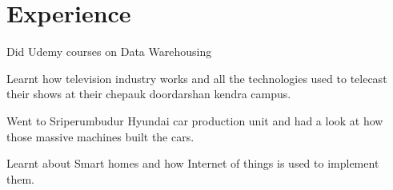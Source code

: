 \documentclass[]{deedy-resume-openfont}
\begin{document}
\hfill
\begin{minipage}[t]{0.66\textwidth} 




\section{Experience}
\vspace{\topsep} %
\begin{tightemize}
\item Did Udemy courses on Data Warehousing 

\end{tightemize}
\sectionsep

\vspace{\topsep} %
\begin{tightemize}
\item Learnt how television industry works and all the technologies used to telecast their shows at their chepauk doordarshan kendra campus.

\end{tightemize}
\sectionsep

\begin{tightemize}
\item Went to Sriperumbudur Hyundai car production unit and had a look at how those massive machines built the cars. 

\end{tightemize}
\sectionsep


\begin{tightemize}
\item Learnt about Smart homes and how Internet of things is used to implement them. 

\end{tightemize}
\sectionsep



\end{minipage}
\end{document}
